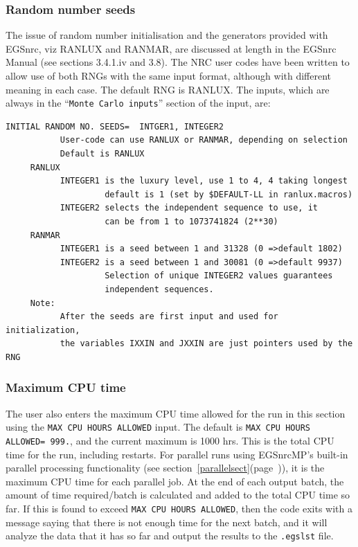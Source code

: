 \documentclass[12pt,twoside]{article}  %
\newcommand{\lpage}[1]{(page~\pageref{#1})}
\begin{document}
\subsubsection{Random number seeds}
\label{rngsect}
The issue of random number initialisation and the generators provided with
EGSnrc, viz RANLUX and RANMAR, are discussed at length in the EGSnrc
Manual\cite{KR00} (see sections 3.4.1.iv and 3.8).  The NRC user codes have
been written to allow use of both RNGs with the same input format, although
with different meaning in each case. The default RNG is RANLUX.  The
inputs, which are always in the ``{\tt Monte Carlo inputs}'' section of the
input, are:
\begin{verbatim}
INITIAL RANDOM NO. SEEDS=  INTGER1, INTEGER2
           User-code can use RANLUX or RANMAR, depending on selection
           Default is RANLUX
     RANLUX
           INTEGER1 is the luxury level, use 1 to 4, 4 taking longest
                    default is 1 (set by $DEFAULT-LL in ranlux.macros)
           INTEGER2 selects the independent sequence to use, it
                    can be from 1 to 1073741824 (2**30)
     RANMAR
           INTEGER1 is a seed between 1 and 31328 (0 =>default 1802)
           INTEGER2 is a seed between 1 and 30081 (0 =>default 9937)
                    Selection of unique INTEGER2 values guarantees
                    independent sequences.
     Note:
           After the seeds are first input and used for initialization,
           the variables IXXIN and JXXIN are just pointers used by the RNG
\end{verbatim}

\subsubsection{Maximum CPU time}
\label{cpusect}
The user also enters the maximum CPU time allowed for the run in
this section using the {\tt MAX CPU HOURS ALLOWED} input.
The default is {\tt MAX CPU HOURS ALLOWED= 999.}, and the
current maximum is 1000 hrs.  This is the total CPU time for the run,
including restarts.  For parallel runs using EGSnrcMP's built-in
parallel processing functionality
(see section~\ref{parallelsect}\lpage{parallelsect}), it is the maximum
CPU time for each parallel job.  At the end of each output batch, the amount
of time required/batch is calculated and added to the total CPU time
so far.  If this is found to exceed {\tt MAX CPU HOURS ALLOWED},
then the code exits with a message saying that there is not enough time
for the next batch, and it will analyze the data that it has so far and
output the results to the {\tt .egslst} file.
\end{document}
